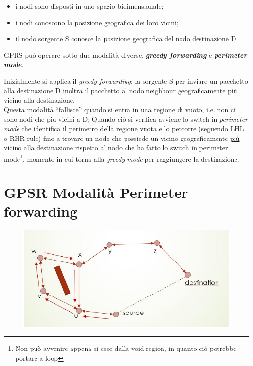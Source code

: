 \begin{itemize}
\item i nodi sono disposti in uno spazio bidimensionale;
\item i nodi conoscono la posizione geografica dei loro vicini;
\item il nodo sorgente S conosce la posizione geografica del nodo destinazione D.
\end{itemize}

GPRS può operare sotto due modalità diverse, \textbf{\emph{greedy forwarding}} e \textbf{\emph{perimeter mode}}.

Inizialmente si applica il \textit{greedy forwarding}: la sorgente S per inviare un pacchetto alla destinazione D inoltra il pacchetto al nodo neighbour geograficamente più vicino alla destinazione.\\
Questa modalità ``fallisce'' quando si entra in una regione di vuoto, i.e. non ci sono nodi che più vicini a D;
Quando ciò si verifica avviene lo switch in \textit{perimeter mode} che identifica il perimetro della regione vuota e lo percorre (seguendo LHL o RHR rule) fino a trovare un nodo che possiede un vicino geograficamente \ul{più vicino alla destinazione rispetto al nodo che ha fatto lo switch in perimeter mode}\footnote{Non può avvenire appena si esce dalla void region, in quanto ciò potrebbe portare a loop}, momento in cui torna alla \textit{greedy mode} per raggiungere la destinazione.




\section{GPSR Modalità Perimeter forwarding}

\begin{figure}[htbp]
   \centering
   \includegraphics{images/questions/Schermata del 2023-10-20 12-13-49.png}
   \label{fig:dom31}
\end{figure}

